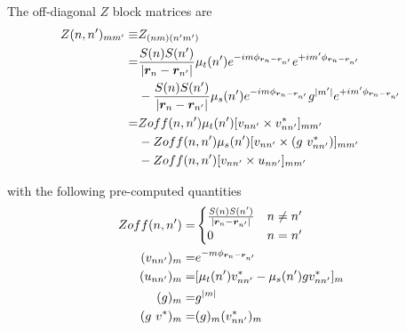 \documentclass [10pt,letterpaper]{article}
\begin{document}
The off-diagonal $Z$ block matrices are
\begin{equation} \label{eq:def-Znnp-off-diagonal}
	\begin{split}
		Z(n,n^\prime)_{m m^\prime}
		\equiv &
		Z_{(n m)(n^\prime m^\prime)}
		\\
		=& 
		\frac{S(n) S(n^\prime)}{\lvert \vectorsym{r}_n-\vectorsym{r}_{n^\prime} \rvert} 
		\mu_t(n^\prime)
		e^{-i m \phi_{\vectorsym{r}_n-\vectorsym{r}_{n^\prime}}}
		e^{+i m^\prime \phi_{\vectorsym{r}_n-\vectorsym{r}_{n^\prime}}}
		\\
		&- 
		\frac{S(n) S(n^\prime)}{\lvert \vectorsym{r}_n-\vectorsym{r}_{n^\prime} \rvert} 
		\mu_s(n^\prime)
		e^{-i m \phi_{\vectorsym{r}_n-\vectorsym{r}_{n^\prime}}}
		g^{\lvert m^\prime \rvert} 
		e^{+i m^\prime \phi_{\vectorsym{r}_n-\vectorsym{r}_{n^\prime}}}
		\\
		=& 
		Zoff(n,n^\prime)
		\mu_t(n^\prime)
		[
			v_{n n^\prime}
			\times
			v^*_{n n^\prime} 
		]
		_{m m^\prime}
		\\
		&- 
		Zoff(n,n^\prime)
		\mu_s(n^\prime)
		[
			v_{n n^\prime}
			\times
			(g\ v^*_{n n^\prime})
		]
		_{m m^\prime}
		\\
		&- 
		Zoff(n,n^\prime)
		[
			v_{n n^\prime}
			\times
			u_{n n^\prime}
		]_{m m^\prime}
	\end{split}
\end{equation}

with the following pre-computed quantities
\begin{subequations} \label{eq:def-Zoff-v-u-g}
	\begin{align}
		Zoff(n,n^\prime)
		=&
		\begin{cases}
			\frac
			{S(n)S(n^\prime)}
			{\lvert \vectorsym{r}_n-\vectorsym{r}_{n^\prime} \rvert} 
			&
			n \neq n^\prime
			\\
			0
			&
			n=n^\prime 
		\end{cases}
		\label{eq:def-Zoffnnp}
		\\
		(v_{n n^\prime})_m
		=&
		e^{- m \phi_{\vectorsym{r}_n-\vectorsym{r}_{n^\prime}}}
		\label{eq:def-vnnp}
		\\
		(u_{n n^\prime})_m
		=&
		[
			\mu_t(n^\prime)
			v^*_{n n^\prime}
			-
			\mu_s(n^\prime)
			g
			v^*_{n n^\prime}
		]_m
		\label{eq:def-unnp}
		\\
		(g)_m
		=&
		g^{\lvert m \rvert}
		\\
		(g\ v^*)_m
		=&
		(g)_m
		(v^*_{n n^\prime})_m 
		\label{eq:def-gm}
	\end{align}
\end{subequations}
\end{document}

